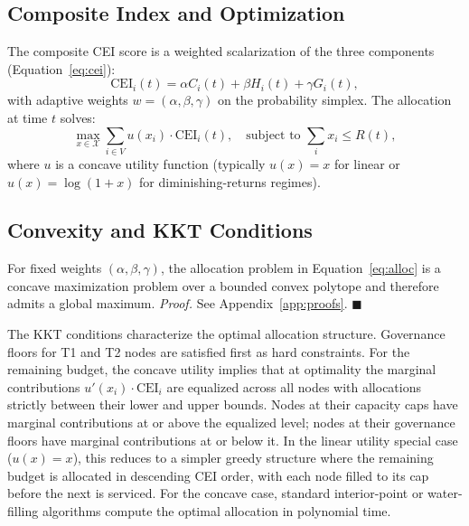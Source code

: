 \documentclass[runningheads]{llncs}
\begin{document}
\subsection{Composite Index and Optimization}

The composite CEI score is a weighted scalarization of the three components (Equation~\ref{eq:cei}):
\begin{equation}
\text{CEI}_i(t) = \alpha C_i(t) + \beta H_i(t) + \gamma G_i(t),
\label{eq:cei}
\end{equation}
with adaptive weights $w = (\alpha, \beta, \gamma)$ on the probability simplex. The allocation at time $t$ solves:
\begin{equation}
\max_{x \in \mathcal{X}} \sum_{i \in V} u(x_i) \cdot \text{CEI}_i(t), \quad \text{subject to } \sum_i x_i \leq R(t),
\label{eq:alloc}
\end{equation}
where $u$ is a concave utility function (typically $u(x) = x$ for linear or $u(x) = \log(1+x)$ for diminishing-returns regimes).

\subsection{Convexity and KKT Conditions}

\begin{proposition}[Convexity]
For fixed weights $(\alpha, \beta, \gamma)$, the allocation problem in Equation~\ref{eq:alloc} is a concave maximization problem over a bounded convex polytope and therefore admits a global maximum. \emph{Proof.} See Appendix~\ref{app:proofs}. $\blacksquare$
\end{proposition}

The KKT conditions characterize the optimal allocation structure. Governance floors for T1 and T2 nodes are satisfied first as hard constraints. For the remaining budget, the concave utility implies that at optimality the marginal contributions $u'(x_i) \cdot \text{CEI}_i$ are equalized across all nodes with allocations strictly between their lower and upper bounds. Nodes at their capacity caps have marginal contributions at or above the equalized level; nodes at their governance floors have marginal contributions at or below it. In the linear utility special case ($u(x) = x$), this reduces to a simpler greedy structure where the remaining budget is allocated in descending CEI order, with each node filled to its cap before the next is serviced. For the concave case, standard interior-point or water-filling algorithms compute the optimal allocation in polynomial time.
\end{document}
